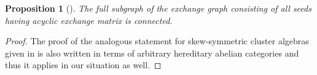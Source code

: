 \documentclass[12pt]{amsart}
\newtheorem{proposition}[theorem]{Proposition}
\begin{document}
  \begin{proposition}[{\cite[Conjecture 4.14(4)]{FZ03}}]
    The full subgraph of the exchange graph consisting of all seeds having acyclic exchange matrix is connected.
  \end{proposition}
  \begin{proof}
    The proof of the analogous statement for skew-symmetric cluster algebras given in \cite[Corollary 4]{caldero-keller2} is also written in terms of arbitrary hereditary abelian categories and thus it applies in our situation as well.
  \end{proof}

%
%
\end{document}
